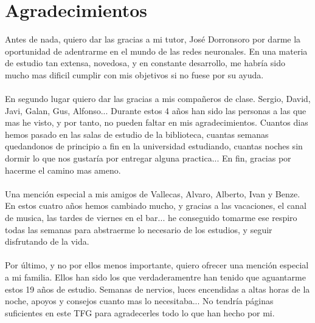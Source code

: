 \chapter*{Agradecimientos}
Antes de nada, quiero dar las gracias a mi tutor, José Dorronsoro por darme la oportunidad de adentrarme en el mundo de las redes neuronales. En una materia de estudio tan extensa, novedosa, y en constante desarrollo, me habría sido mucho mas dificil cumplir con mis objetivos si no fuese por su ayuda.\\\\
En segundo lugar quiero dar las gracias a mis compañeros de clase. Sergio, David, Javi, Galan, Gus, Alfonso... Durante estos 4 años han sido las personas a las que mas he visto, y por tanto, no pueden faltar en mis agradecimientos. Cuantos dias hemos pasado en las salas de estudio de la biblioteca, cuantas semanas quedandonos de principio a fin en la universidad estudiando, cuantas noches sin dormir lo que nos gustaría por entregar alguna practica... En fin, gracias por hacerme el camino mas ameno.\\\\
Una mención especial a mis amigos de Vallecas, Alvaro, Alberto, Ivan y Benze. En estos cuatro años hemos cambiado mucho, y gracias a las vacaciones, el canal de musica, las tardes de viernes en el bar... he conseguido tomarme ese respiro todas las semanas para abstraerme lo necesario de los estudios, y seguir disfrutando de la vida.\\\\
Por último, y no por ellos menos importante, quiero ofrecer una mención especial a mi familia. Ellos han sido los que verdaderamentre han tenido que aguantarme estos 19 años de estudio. Semanas de nervios, luces encendidas a altas horas de la noche, apoyos y consejos cuanto mas lo necesitaba... No tendría páginas suficientes en este TFG para agradecerles todo lo que han hecho por mi.
